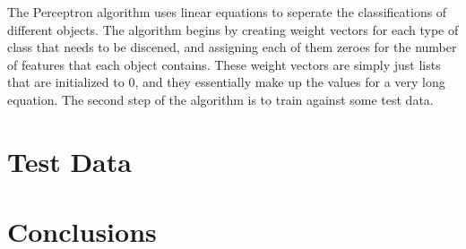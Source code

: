 \documentclass{article}
\begin{document}
The Perceptron algorithm uses linear equations to seperate the classifications of different objects. The algorithm begins by creating weight vectors for each type of class that needs to be discened, and assigning each of them zeroes for the number of features that each object contains. These weight vectors are simply just lists that are initialized to 0, and they essentially make up the values for a very long equation. The second step of the algorithm is to train against some test data. 

\section{Test Data}

\section{Conclusions}
\end{document}
